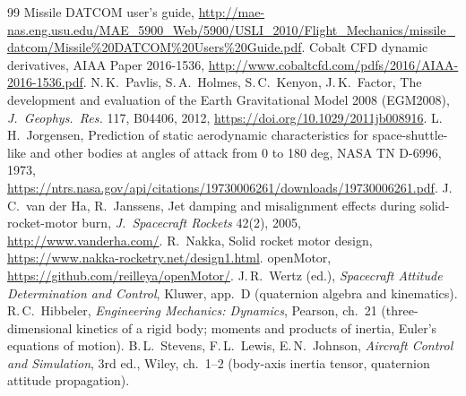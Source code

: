 \documentclass[10pt]{extarticle}
\numberwithin{equation}{subsection}
\begin{document}
\begin{thebibliography}{99}
 Missile DATCOM user's guide, \url{http://mae-nas.eng.usu.edu/MAE_5900_Web/5900/USLI_2010/Flight_Mechanics/missile_datcom/Missile%20DATCOM%20Users%20Guide.pdf}.
 Cobalt CFD dynamic derivatives, AIAA Paper 2016-1536,
\url{http://www.cobaltcfd.com/pdfs/2016/AIAA-2016-1536.pdf}.
 N.\,K.\ Pavlis, S.\,A.\ Holmes, S.\,C.\ Kenyon, J.\,K.\ Factor, The development and
evaluation of the Earth Gravitational Model 2008 (EGM2008), \emph{J.\ Geophys.\ Res.} 117, B04406,
2012, \url{https://doi.org/10.1029/2011jb008916}.
 L.\,H.\ Jorgensen, Prediction of static aerodynamic characteristics for
space-shuttle-like and other bodies at angles of attack from 0 to 180 deg, NASA TN D-6996, 1973,
\url{https://ntrs.nasa.gov/api/citations/19730006261/downloads/19730006261.pdf}.
 J.\,C.\ van der Ha, R.\ Janssens, Jet damping and misalignment effects during
solid-rocket-motor burn, \emph{J.\ Spacecraft Rockets} 42(2), 2005,
\url{http://www.vanderha.com/}.
 R.\ Nakka, Solid rocket motor design, \url{https://www.nakka-rocketry.net/design1.html}.
 openMotor, \url{https://github.com/reilleya/openMotor/}.
 J.\,R.\ Wertz (ed.), \emph{Spacecraft Attitude Determination and Control}, Kluwer,
app.\ D (quaternion algebra and kinematics).
 R.\,C.\ Hibbeler, \emph{Engineering Mechanics: Dynamics}, Pearson,
ch.\ 21 (three-dimensional kinetics of a rigid body; moments and products of inertia,
Euler's equations of motion).
 B.\,L.\ Stevens, F.\,L.\ Lewis, E.\,N.\ Johnson, \emph{Aircraft Control and
Simulation}, 3rd ed., Wiley, ch.\ 1--2 (body-axis inertia tensor, quaternion attitude
propagation).
\end{thebibliography}
\end{document}
